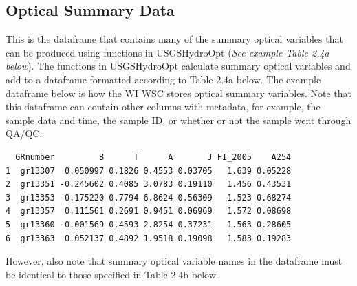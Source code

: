 \documentclass[a4paper,11pt]{article}\usepackage[]{graphicx}\usepackage[]{color}
\makeatletter
\newenvironment{kframe}{%
 \def\at@end@of@kframe{}%
 \ifinner\ifhmode%
  \def\at@end@of@kframe{\end{minipage}}%
  \begin{minipage}{\columnwidth}%
 \fi\fi%
 \def\FrameCommand##1{\hskip\@totalleftmargin \hskip-\fboxsep
 \colorbox{shadecolor}{##1}\hskip-\fboxsep
     \hskip-\linewidth \hskip-\@totalleftmargin \hskip\columnwidth}%
 \MakeFramed {\advance\hsize-\width
   \@totalleftmargin\z@ \linewidth\hsize
   \@setminipage}}%
 {\par\unskip\endMakeFramed%
 \at@end@of@kframe}
\newenvironment{knitrout}{}{} %
\makeatother
\begin{document}
\begin{knitrout}
\color{fgcolor}\begin{kframe}


{\ttfamily\noindent\bfseries\color{errorcolor}{Error: object 'dfsags' not found}}\end{kframe}
\end{knitrout}

\subsection{Optical Summary Data}
This is the dataframe that contains many of the summary optical variables that can be produced using functions in USGSHydroOpt (\emph{See example Table 2.4a below}). The functions in USGSHydroOpt calculate summary optical variables and add to a dataframe formatted according to Table 2.4a below.  The example dataframe below is how the WI WSC stores optical summary variables. Note that this dataframe can contain other columns with metadata, for example, the sample data and time, the sample ID, or whether or not the sample went through QA/QC.

\begin{knitrout}
\color{fgcolor}\begin{kframe}
\begin{verbatim}
  GRnumber         B      T      A       J FI_2005    A254
1  gr13307  0.050997 0.1826 0.4553 0.03705   1.639 0.05228
2  gr13351 -0.245602 0.4085 3.0783 0.19110   1.456 0.43531
3  gr13353 -0.175220 0.7794 6.8624 0.56309   1.523 0.68274
4  gr13357  0.111561 0.2691 0.9451 0.06969   1.572 0.08698
5  gr13360 -0.001569 0.4593 2.8254 0.37231   1.563 0.28605
6  gr13363  0.052137 0.4892 1.9518 0.19098   1.583 0.19283
\end{verbatim}
\end{kframe}
\end{knitrout}

However, also note that summary optical variable names in the dataframe must be identical to those specified in Table 2.4b below. 
\end{document}
